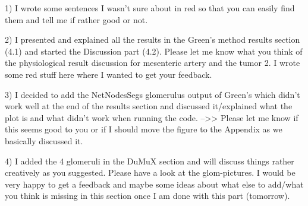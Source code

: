 
1) I wrote some sentences I wasn't sure about in red so that you can easily find them and tell me if rather good or not.

2) I presented and explained all the results in the Green's method results section (4.1) and started the Discussion part (4.2). Please let me know what you think of the physiological result discussion for mesenteric artery and the tumor 2. I wrote some red stuff here where I wanted to get your feedback.

3) I decided to add the NetNodesSegs glomerulus output of Green's which didn't work well at the end of the results section and discussed it/explained what the plot is and what didn't work when running the code.
-->> Please let me know if this seems good to you or if I should move the figure to the Appendix as we basically discussed it.

4) I added the 4 glomeruli in the DuMuX section and will discuss things rather creatively as you suggested. Please have a look at the glom-pictures. I would be very happy to get a feedback and maybe some ideas about what else to add/what you think is missing in this section once I am done with this part (tomorrow).